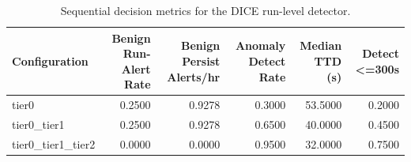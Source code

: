 \begin{table}[t]
\centering
\caption{Sequential decision metrics for the DICE run-level detector.}
\label{tab:dice_sequential_metrics}
\footnotesize
\begin{tabular}{lrrrrr}
\toprule
Configuration & Benign Run-Alert Rate & Benign Persist Alerts/hr & Anomaly Detect Rate & Median TTD (s) & Detect <=300s \\
\midrule
tier0 & 0.2500 & 0.9278 & 0.3000 & 53.5000 & 0.2000 \\
tier0_tier1 & 0.2500 & 0.9278 & 0.6500 & 40.0000 & 0.4500 \\
tier0_tier1_tier2 & 0.0000 & 0.0000 & 0.9500 & 32.0000 & 0.7500 \\
\bottomrule
\end{tabular}

\end{table}
